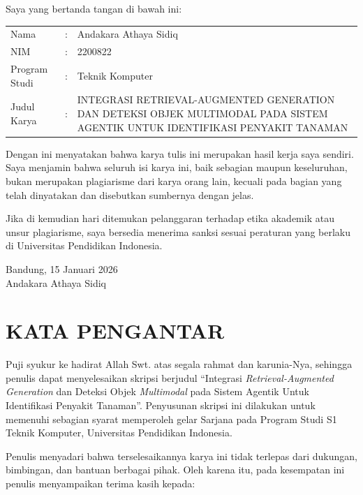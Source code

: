 \documentclass[12pt, a4paper, oneside]{report}
\newcommand{\thesistitle}{INTEGRASI RETRIEVAL-AUGMENTED GENERATION DAN DETEKSI OBJEK MULTIMODAL PADA SISTEM AGENTIK UNTUK IDENTIFIKASI PENYAKIT TANAMAN}
\newcommand{\authorname}{Andakara Athaya Sidiq}
\newcommand{\studentid}{2200822}
\newcommand{\thesisyear}{2026}
\begin{document}
\noindent Saya yang bertanda tangan di bawah ini: \par
\noindent
\begin{tabular}{@{}l p{0.2cm} l}
    Nama & : & \authorname \\
    NIM & : & \studentid \\
    Program Studi & : & Teknik Komputer \\
    Judul Karya & : & \parbox[t]{11cm}{\thesistitle}
\end{tabular}
\vspace{\baselineskip}
\begin{center}
Dengan ini menyatakan bahwa karya tulis ini merupakan hasil kerja saya sendiri. Saya menjamin bahwa seluruh isi karya ini, baik sebagian maupun keseluruhan, bukan merupakan plagiarisme dari karya orang lain, kecuali pada bagian yang telah dinyatakan dan disebutkan sumbernya dengan jelas. \par
\vspace{\baselineskip}
Jika di kemudian hari ditemukan pelanggaran terhadap etika akademik atau unsur plagiarisme, saya bersedia menerima sanksi sesuai peraturan yang berlaku di Universitas Pendidikan Indonesia.\par
\end{center}

\vfill
\begin{center}
    Bandung, 15 Januari \thesisyear \\
    \vspace{2.5cm}
    \authorname
\end{center}
\vspace{1.5cm}
\clearpage

\chapter*{KATA PENGANTAR}

Puji syukur ke hadirat Allah Swt. atas segala rahmat dan karunia-Nya, sehingga penulis dapat menyelesaikan skripsi berjudul “Integrasi \textit{Retrieval-Augmented Generation} dan Deteksi Objek \textit{Multimodal} pada Sistem Agentik Untuk Identifikasi Penyakit Tanaman”. Penyusunan skripsi ini dilakukan untuk memenuhi sebagian syarat memperoleh gelar Sarjana pada Program Studi S1 Teknik Komputer, Universitas Pendidikan Indonesia.

Penulis menyadari bahwa terselesaikannya karya ini tidak terlepas dari dukungan, bimbingan, dan bantuan berbagai pihak. Oleh karena itu, pada kesempatan ini penulis menyampaikan terima kasih kepada:
\end{document}
